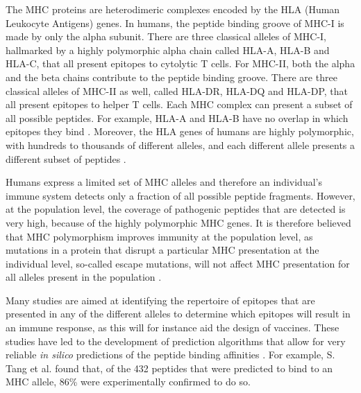 The MHC proteins are heterodimeric complexes encoded by the
HLA (Human Leukocyte Antigens) genes.
In humans, the peptide binding groove of MHC-I is made by only the alpha subunit. There are three classical alleles of MHC-I, hallmarked by a highly polymorphic alpha chain called HLA-A, HLA-B and HLA-C, that all present epitopes to cytolytic T cells. 
For MHC-II, both the alpha and the beta chains contribute to the peptide binding groove. There are three classical alleles of MHC-II as well, called HLA-DR, HLA-DQ and HLA-DP, that all present epitopes to helper T cells.
Each MHC complex can present a subset of all possible peptides.
For example, HLA-A and HLA-B have no overlap in which
epitopes they bind \cite{lund2004definition}.
Moreover, the HLA genes of humans are highly polymorphic, with hundreds 
to thousands of different alleles, 
and each different allele presents a different subset of peptides \cite{marsh2010nomenclature}.


Humans express a limited set of MHC alleles
and therefore an individual's immune system detects 
only a fraction of all possible peptide fragments. 
However, at the population level, the coverage of pathogenic peptides that are detected 
is very high, because of the highly polymorphic MHC genes.
It is therefore believed that MHC polymorphism improves immunity at the population level, 
as mutations in a protein that disrupt a particular MHC presentation at the individual level, 
so-called escape mutations, 
will not affect MHC presentation for all alleles present in the population \cite{sommer2005importance}.


Many studies are aimed at identifying the repertoire of epitopes that are presented 
in any of the different alleles to determine which epitopes will result in an immune response, 
as this will for instance aid the design of vaccines. 
These studies have led to the development of prediction algorithms 
that allow for very reliable \emph{in silico} 
predictions of the peptide binding affinities
\cite{larsen2010identification,schellens2008unanticipated,tang2011genome}.
For example, S. Tang et al. \cite{tang2011genome} found that, 
of the 432 peptides that were predicted to bind to an MHC allele,
86\% were experimentally confirmed to do so. 


